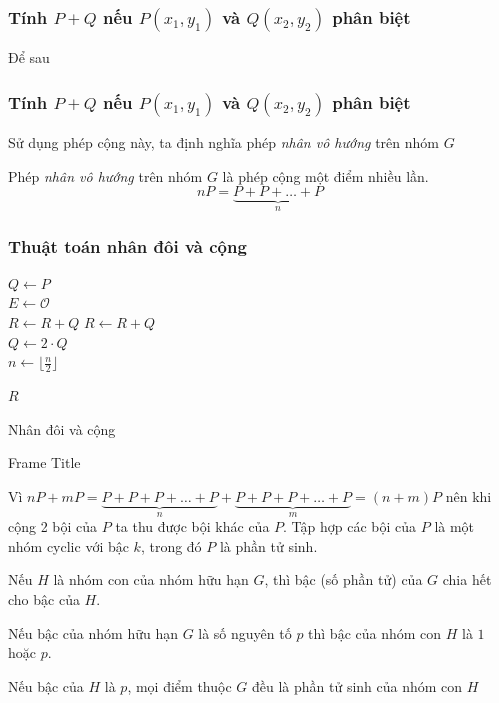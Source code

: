 \documentclass [xcolor=svgnames, t] {beamer}
\theoremstyle{definition}
\begin{document}
\begin{frame}
    \frametitle{Tính $P+Q$ nếu $P(x_1,y_1)$ và $Q(x_2,y_2)$ phân biệt  }
    Để sau


\end{frame}
\begin{frame}
    \frametitle{Tính $P+Q$ nếu $P(x_1,y_1)$ và $Q(x_2,y_2)$ phân biệt  }
    Sử dụng phép cộng này, ta định nghĩa phép \textit{nhân vô hướng} trên nhóm $G$
    \begin{definition}
        Phép \textit{nhân vô hướng} trên nhóm $G$ là phép cộng một điểm nhiều lần.
        \begin{equation}
            nP = \underbrace{P+P+ \ldots +P}_{n}
        \end{equation}
    \end{definition}
\end{frame}
\begin{frame}
    \frametitle{Thuật toán nhân đôi và cộng}

    \begin{algorithm}[H]
        \Begin
        {
            $Q \gets P$ \\
            $E \gets \mathcal{O}$ \\
            {
                {
                    $R \gets R + Q$
                }
                {
                    $R \gets R + Q$ \\
                    $Q \gets 2 \cdot Q$ \\
                    $n \gets \lfloor \frac{n}{2} \rfloor $
                }
            }

            \Return $R$
        }
        \caption{Nhân đôi và cộng}
    \end{algorithm}

\end{frame}

\begin{frame}{Frame Title}
    \begin{corollary}
        Vì $nP + mP = \underbrace{P+P+P+\ldots+P}_{n} + \underbrace{P+P+P+\ldots+P}_{m} = (n+m)P$
        nên khi cộng 2 bội của $P$ ta thu được bội khác của $P$. Tập hợp các bội của $P$ là một nhóm cyclic với bậc $k$, trong đó $P$ là phần tử sinh.
    \end{corollary}
    \begin{theorem}
        Nếu $H$ là nhóm con của nhóm hữu hạn $G$, thì bậc (số phần tử) của $G$ chia hết cho bậc của $H$.
    \end{theorem}
    \begin{corollary}
        Nếu bậc của nhóm hữu hạn $G$ là số nguyên tố $p$ thì bậc của nhóm con $H$ là $1$ hoặc $p$.

        Nếu bậc của $H$ là $p$, mọi điểm thuộc $G$ đều là phần tử sinh của nhóm con $H$
    \end{corollary}
\end{frame}
\end{document}
